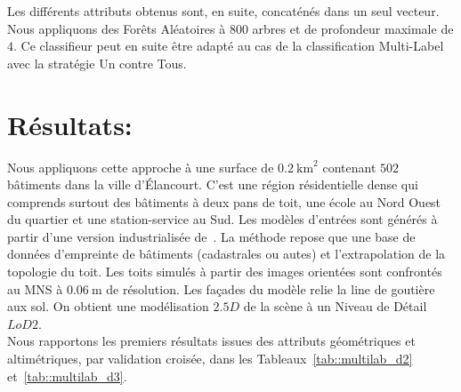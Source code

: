 \documentclass[a4paper,french]{article}
\begin{document}
    Les différents attributs obtenus sont, en suite, concaténés dans un seul vecteur. Nous appliquons des Forêts Aléatoires à $800$ arbres et de profondeur maximale de $4$. Ce classifieur peut en suite être adapté au cas de la classification Multi-Label avec la stratégie Un contre Tous.

    \section{Résultats:}

    Nous appliquons cette approche à une surface de $\SI{0.2}{\km \squared}$ contenant $502$ bâtiments dans la ville d'\'Elancourt. C'est une région résidentielle dense qui comprends surtout des bâtiments à deux pans de toit, une école au Nord Ouest du quartier et une station-service au Sud. Les modèles d'entrées sont générés à partir d'une version industrialisée de~\cite{Durupt2006}. La méthode repose que une base de données d'empreinte de bâtiments (cadastrales ou autes) et l'extrapolation de la topologie du toit. Les toits simulés à partir des images orientées sont confrontés au MNS à $\SI{0.06}{\m}$ de résolution. Les façades du modèle relie la line de goutière aux sol. On obtient une modélisation $2.5D$ de la scène à un Niveau de Détail $LoD 2$.\\

    Nous rapportons les premiers résultats issues des attributs géométriques et altimétriques, par validation croisée, dans les Tableaux~\ref{tab::multilab_d2} et~\ref{tab::multilab_d3}.
\end{document}

